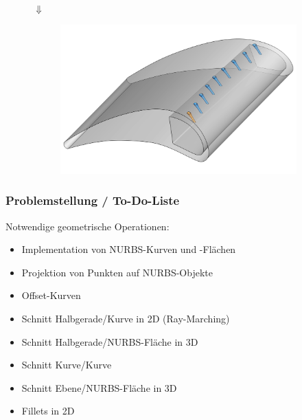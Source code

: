 \documentclass[8pt, aspectratio=169]{beamer}
\begin{document}
\begin{frame}
\begin{minipage}[t]{0.35\textwidth}
\begin{figure}[H]
\begin{subfigure}{0.8\textwidth}
			\end{subfigure}\\
			$\Downarrow$\\
			\begin{subfigure}{0.8\textwidth}
				\includegraphics[width=\textwidth]{../../tec/holes/22edit.png}
			\end{subfigure}
		\end{figure}
	\end{minipage}
	\vfill
\end{frame}

\begin{frame}
	\frametitle{Problemstellung / To-Do-Liste}
	\vspace{-0.5cm}\hspace{-0.5cm}
	\begin{minipage}[t]{.8\textwidth}
		Notwendige geometrische Operationen:
		\begin{itemize}
			\item[\ding{108}] 	Implementation von NURBS-Kurven und -Flächen
			\item[\ding{108}]	Projektion von Punkten auf NURBS-Objekte
			\item[\ding{109}]	Offset-Kurven
			\item[\ding{109}]	Schnitt Halbgerade/Kurve in 2D (Ray-Marching)
			\item[\ding{108}]	Schnitt Halbgerade/NURBS-Fläche in 3D
			\item[\ding{108}]	Schnitt Kurve/Kurve
			\item[\ding{108}]	Schnitt Ebene/NURBS-Fläche in 3D
			\item[\ding{109}]	Fillets in 2D
		\end{itemize}
	\end{minipage}
	\vfill
\end{frame}
\end{document}
